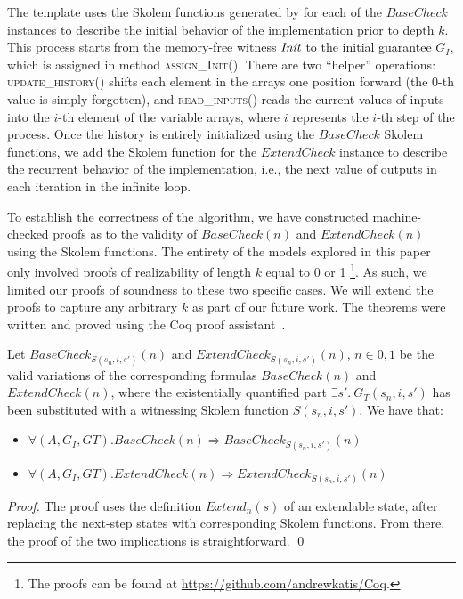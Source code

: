 The template uses the Skolem functions generated by \aeval for each
of the $\mathit{BaseCheck}$ instances to describe the initial behavior of
the implementation prior to depth $k$.  This process starts from the memory-free
witness $\textit{Init}$ to the initial guarantee $G_I$, which is assigned in method \textsc{assign\_Init()}.
There are two ``helper'' operations:
\textsc{update\_history()} shifts each element in the arrays one position
forward (the 0-th value is simply forgotten), and \textsc{read\_inputs()} reads the
current values of inputs into the $i$-th element of the variable arrays,
where $i$ represents the $i$-th step of the process.
Once the history is entirely initialized using the $\mathit{BaseCheck}$ Skolem functions,
we add the Skolem function for the $\mathit{ExtendCheck}$ instance to describe the 
recurrent behavior of the implementation, i.e., the next value of outputs in each 
iteration in the infinite loop.

To establish the correctness of the algorithm,
we have constructed machine-checked proofs as to the validity of $\mathit{BaseCheck(n)}$ and
$\mathit{ExtendCheck(n)}$ using the Skolem functions. 
The entirety of the models explored in
this paper only involved proofs of realizability of length $k$ equal to 0 or
1%
\footnote{The proofs can be found at \url{https://github.com/andrewkatis/Coq}.}.
As such, we limited our proofs of soundness to these two specific cases. We will
extend the proofs to capture any arbitrary $k$ as part of our future work.
The theorems were written and proved using the Coq proof
assistant~\cite{Coqmanual}.

\begin{theorem} Let $\mathit{BaseCheck}_{S(s_n,i,s')}(n)$ and
$\mathit{ExtendCheck}_{S(s_n,i,s')}(n)$, $n \in {0,1}$ be the valid
variations of the corresponding formulas $\mathit{BaseCheck(n)}$ and
$\mathit{ExtendCheck(n)}$, where the existentially quantified part $\exists s'.~
G_T(s_n, i, s')$ has been substituted with a witnessing Skolem function
$S(s_n,i,s')$.  We have that:
\begin{itemize}
\item $\forall (A,G_{I},G{T}). \mathit{BaseCheck}(n) \Rightarrow \mathit{BaseCheck}_{S(s_n,i,s')}(n)$
\item $\forall (A,G_{I},G{T}). \mathit{ExtendCheck}(n) \Rightarrow
ExtendCheck_{S(s_n,i,s')}(n)$
\end{itemize}
\end{theorem}
\begin{proof}
The proof uses the definition $\mathit{Extend}_n(s)$ of an extendable state,
after replacing the next-step states with corresponding Skolem functions. From there,
the proof of the two implications is straightforward.
\qed
\end{proof}


